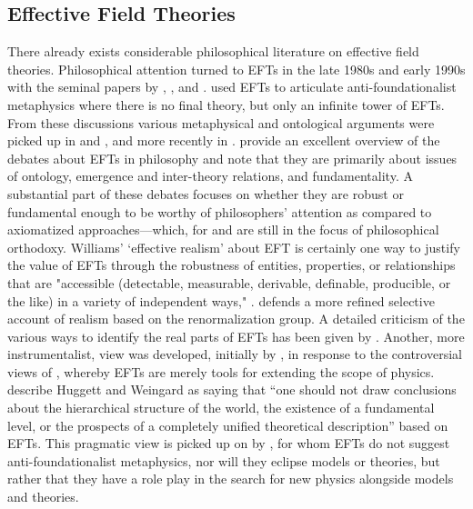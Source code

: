 \subsection{Effective Field Theories}\label{PhilEFT}

There already exists considerable philosophical literature on effective field theories.
Philosophical attention turned to EFTs in the late 1980s and early 1990s with the seminal papers by \citet{teller89}, \citet{cao1993}, and \citet{huggetweingard}. 
\citet{cao1993} used EFTs to articulate anti-foundationalist metaphysics where there is no final theory, but only an infinite tower of EFTs. 
From these discussions various metaphysical and ontological arguments were picked up in \citet{castellani2002} and \citet{fraser2009}, and more recently in \citep{bain2013a,Crowther2016-CROESU,Rivat2020-RIVPFO,Ruetsche2018,williams2018}. 
\citet{Rivat2020-RIVPFO} provide an excellent overview of the debates about EFTs in philosophy and note that they are primarily about issues of ontology, emergence and inter-theory relations, and fundamentality. 
A substantial part of these debates focuses on whether they are robust or fundamental enough to be worthy of philosophers' attention as compared to axiomatized approaches---which, for \citet{wallace2006} and \citet{williams2018} are still in the focus of philosophical orthodoxy. 
Williams' `effective realism' about EFT is certainly one way to justify the value of EFTs through the robustness of entities, properties, or relationships that are "accessible (detectable, measurable, derivable, definable, producible,
or the like) in a variety of independent ways," \citep[p.~219]{williams2018}.  
\citet{fraserj2020} defends a more refined selective account of realism based on  the renormalization group. 
A detailed criticism of the various ways to identify the real parts of EFTs has been given by \citep{rivat2020a}.
Another, more instrumentalist, view was developed, initially by \citet{huggetweingard}, in response to the controversial views of \citet{cao1993}, whereby EFTs are merely tools for extending the scope of physics. 
\citet{Rivat2020-RIVPFO} describe Huggett and Weingard as saying that 
``one should not draw conclusions about the hierarchical structure of the world, the existence of a fundamental level, or the prospects of a completely unified theoretical description'' based on EFTs.
This pragmatic view is picked up on by \citet{hartmann2001}, for whom EFTs do not suggest anti-foundationalist metaphysics, nor will they eclipse models or theories, but rather that they have a role play in the search for new physics alongside models and theories.

